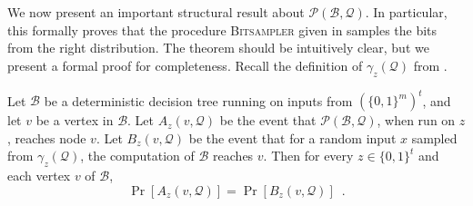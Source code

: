 \documentclass{toc}
\newcommand{\clB}{\mathcal{B}}
\newcommand{\clQ}{\mathcal{Q}}
\newcommand{\clP}{\mathcal{P}}
\begin{document}
We now present an important structural result about $\clP (\clB, \clQ)$.  In particular, this formally proves that the procedure \textsc{Bitsampler} given in  samples the bits from the right distribution. The theorem should be intuitively clear, but we present a formal proof for completeness. Recall the definition of $\gamma_z(\clQ)$ from .
\begin{theorem}
\label{samedistn}
Let $\clB$ be a deterministic decision tree running on inputs from $(\{0,1\}^m)^t$, and let $v$ be a vertex in $\clB$. 
Let $A_z(v, \clQ)$ be the event that $\clP (\clB, \clQ)$, when run on $z$, reaches node $v$.  
Let $B_z(v, \clQ)$ be the event that for a random input $x$ sampled from $\gamma_z(\clQ)$, the computation of $\clB$ reaches $v$. 
Then for every $z \in \{0,1\}^t$ and each vertex $v$ of $\clB$, 
\[
\Pr[A_z(v,\clQ)] =\Pr[B_z(v,\clQ)] \enspace .
\]
\end{theorem}
\end{document}
